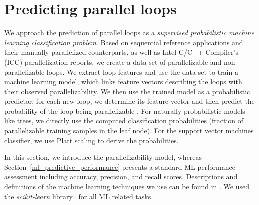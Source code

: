 \section{Predicting parallel loops}
\label{predicting_parallel_loops}
\quad We approach the prediction of parallel loops as a \emph{supervised probabilistic machine learning classification problem}. Based on sequential reference applications and their manually parallelized counterparts, as well as Intel C/C++ Compiler's (ICC) parallelization reports, we create a data set of parallelizable and non-parallelizable loops. We extract loop features and use the data set to train a machine learning model, which links feature vectors describing the loops with their observed parallelizability. We then use the trained model as a probabilistic predictor: for each new loop, we determine its feature vector and then predict the probability of the loop being parallelizable \cite{Niculescu-Mizil:2005:PGP:1102351.1102430}. For naturally probabilistic models like trees, we directly use the computed classification probabilities (fraction of parallelizable training samples in the leaf node). For the support vector machines classifier, we use Platt scaling to derive the probabilities.

In this section, we introduce the parallelizability model, whereas Section~\ref{ml_predictive_performance} presents a standard ML performance assessment including accuracy, precision, and recall scores. Descriptions and definitions of the machine learning techniques we use can be found in \cite{James:2013:ISL:2517747}. We used the \textit{scikit-learn} library~\cite{scikit-learn} for all ML related tasks.

